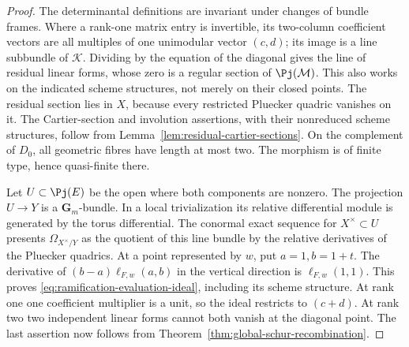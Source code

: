 \begin{proof}
The determinantal definitions are invariant under changes of bundle
frames.  Where a rank-one matrix entry is invertible, its two-column
coefficient vectors are all multiples of one unimodular vector
\((c,d)\); its image is a line subbundle of \(\mathcal K\).
Dividing by the equation of the diagonal gives the line of residual
linear forms, whose zero is a regular section of
\(\Pj(\mathcal M)\).  This also works on the indicated
scheme structures, not merely on their closed points.  The residual
section lies in \(X\), because every restricted Pluecker quadric
vanishes on it.  The Cartier-section and involution assertions, with their
nonreduced scheme structures, follow from
Lemma~\ref{lem:residual-cartier-sections}.  On the complement
of \(D_0\), all geometric fibres have length at most two.  The
morphism is of finite type, hence quasi-finite there.

Let \(U\subset\Pj(E)\) be the open where both components
are nonzero.  The projection \(U\to Y\) is a
\(\mathbf G_m\)-bundle.  In a local trivialization its relative
differential module is generated by the torus differential.  The
conormal exact sequence for \(X^\times\subset U\) presents
\(\Omega_{X^\times/Y}\) as the quotient of this line bundle
by the relative derivatives of the Pluecker quadrics.  At a point
represented by \(w\), put \(a=1,b=1+t\).  The derivative of
\((b-a)\ell_{F,w}(a,b)\) in the vertical direction is
\(\ell_{F,w}(1,1)\).  This proves
\eqref{eq:ramification-evaluation-ideal}, including its scheme
structure.  At rank one one coefficient multiplier is a unit, so the
ideal restricts to \((c+d)\).  At rank two two independent linear
forms cannot both vanish at the diagonal point.  The last assertion
now follows from Theorem~\ref{thm:global-schur-recombination}.
\end{proof}

